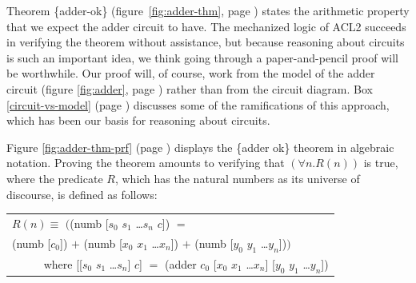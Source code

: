 Theorem \{adder-ok\} (figure~\ref{fig:adder-thm}, page \pageref{fig:adder-thm})
states the arithmetic property that we expect the adder circuit to have.
The mechanized logic of ACL2 succeeds in verifying
the theorem without assistance,
but because reasoning about circuits is such an important idea,
we think going through
a paper-and-pencil proof will be worthwhile.
Our proof will, of course, work from
the model of the adder circuit
(figure \ref{fig:adder}, page \pageref{fig:adder})
rather than from the circuit diagram.
Box \ref{circuit-vs-model} (page \pageref{circuit-vs-model})
discusses some of the ramifications of this approach,
which has been our basis for reasoning about circuits.

Figure \ref{fig:adder-thm-prf} (page \pageref{fig:adder-thm-prf})
displays the \{adder ok\} theorem in algebraic notation.
Proving the theorem amounts to
verifying that $(\forall n.R(n))$ is true,
where the predicate $R$, which has the natural numbers as
its universe of discourse, is defined as follows:
\begin{center}
\begin{tabular}{l}
$R(n) \equiv$ $($\textsf{(numb [$s_0$ $s_1$ \dots $s_{n}$ $c$])} $=$\\
\phantom{$R(n) \equiv$ $($}\textsf{(numb [$c_0$])} $+$ \textsf{(numb [$x_0$ $x_1$ \dots $x_{n}$])} $+$ \textsf{(numb [$y_0$ $y_1$ \dots $y_{n}$])}$)$ \\
~~~~~ where \textsf{[[$s_0$ $s_1$ \dots $s_{n}$] $c$]} $=$ \textsf{(adder $c_0$ [$x_0$ $x_1$ \dots $x_{n}$] [$y_0$ $y_1$ \dots $y_{n}$])}\\
\end{tabular}
\end{center}

